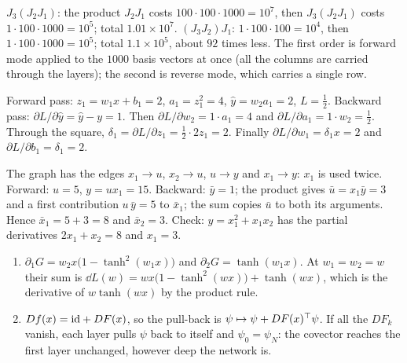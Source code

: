 $J_3(J_2J_1)$: the product $J_2J_1$ costs
$100\cdot100\cdot1000 = 10^7$, then $J_3(J_2J_1)$ costs
$1\cdot100\cdot1000 = 10^5$; total $1.01\times10^7$.
$(J_3J_2)J_1$: $1\cdot100\cdot100 = 10^4$, then
$1\cdot100\cdot1000 = 10^5$; total $1.1\times10^5$, about $92$ times
less. The first order is forward mode applied to the $1000$ basis vectors
at once (all the columns are carried through the layers); the second is
reverse mode, which carries a single row.

Forward pass: $z_1 = w_1x + b_1 = 2$, $a_1 = z_1^2 = 4$,
$\hat y = w_2a_1 = 2$, $L = \frac12$. Backward pass:
$\partial L/\partial\hat y = \hat y - y = 1$. Then
$\partial L/\partial w_2 = 1\cdot a_1 = 4$ and
$\partial L/\partial a_1 = 1\cdot w_2 = \frac12$. Through the square,
$\delta_1 = \partial L/\partial z_1 = \frac12\cdot2z_1 = 2$. Finally
$\partial L/\partial w_1 = \delta_1x = 2$ and
$\partial L/\partial b_1 = \delta_1 = 2$.

The graph has the edges $x_1\to u$, $x_2\to u$, $u\to y$ and $x_1\to y$:
$x_1$ is used twice. Forward: $u = 5$, $y = ux_1 = 15$. Backward:
$\bar y = 1$; the product gives $\bar u = x_1\bar y = 3$ and a first
contribution $u\,\bar y = 5$ to $\bar x_1$; the sum copies $\bar u$ to
both its arguments. Hence $\bar x_1 = 5 + 3 = 8$ and $\bar x_2 = 3$.
Check: $y = x_1^2 + x_1x_2$ has the partial derivatives
$2x_1 + x_2 = 8$ and $x_1 = 3$.

\begin{enumerate}[nosep]
  \item $\partial_1G = w_2x\bigl(1 - \tanh^2(w_1x)\bigr)$ and
        $\partial_2G = \tanh(w_1x)$. At $w_1 = w_2 = w$ their sum is
        $\dd L(w) = wx\bigl(1 - \tanh^2(wx)\bigr) + \tanh(wx)$, which is
        the derivative of $w\tanh(wx)$ by the product rule.
  \item $Df(x) = \mathrm{id} + DF(x)$, so the pull-back is
        $\psi\mapsto\psi + DF(x)^{\top}\psi$. If all the $DF_k$ vanish,
        each layer pulls $\psi$ back to itself and $\psi_0 = \psi_N$: the
        covector reaches the first layer unchanged, however deep the
        network is.
\end{enumerate}

\section{}


